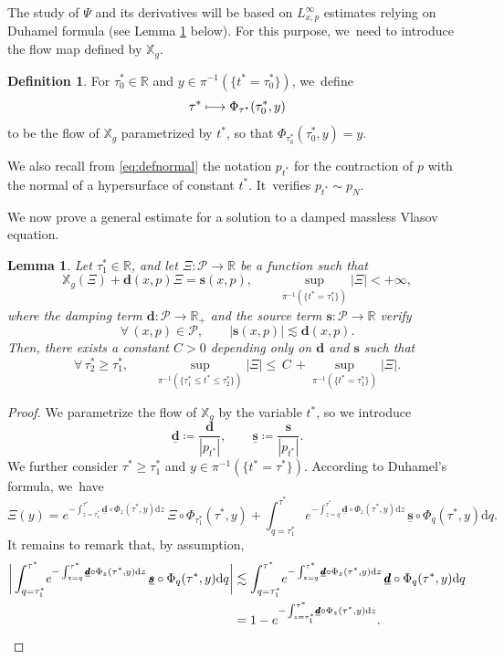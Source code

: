 \documentclass[JEP,XML,SOM,Unicode,published]{cedram}
\newcommand\mto{\mathchoice{\longmapsto}{\mapsto}{\mapsto}{\mapsto}}
\theoremstyle{plain}
\newtheorem{lemma}[proposition]{Lemma}
\theoremstyle{definition}
\newtheorem{definition}[proposition]{Definition}
\newcommand\R{{\mathbb{R}}}
\newcommand\T{{\mathbb{X}}}
\newcommand\dr{{\mathrm{d}}}
\begin{document}
The study of $\Psi$ and its derivatives will be based on $L^\infty_{x,p}$ estimates relying on Duhamel formula (see Lemma \ref{LemDuhamel} below). For this purpose, we~need to introduce the flow map defined by $\T_g$.
\begin{definition}
For $\tau^*_0\in \R$ and $y \in \pi^{-1}(\{t^*=\tau_0^* \})$, we~define
\[
\tau^* \mto \Phi_{\tau^*} (\tau_0^*,y)
\]
to be the flow of $\T_g$ parametrized by $t^*$, so that $\Phi_{\tau_0^*}(\tau_0^*,y)=y$.
\end{definition}
We also recall from \eqref{eq:defnormal} the notation $p_{t^*}$ for the contraction of $p$ with the normal of a hypersurface of constant $t^*$. It~verifies $p_{t^*} \sim p_N$.

We now prove a general estimate for a solution to a damped massless Vlasov equation.

\begin{lemma}\label{LemDuhamel}
Let $\tau_1^* \in \R$, and let $\Xi \colon \mathcal{P} \to \R$ be a function such that
\[
\T_g (\Xi)+ \pmb{d}(x,p) \Xi=\pmb{s}(x,p),\qquad \sup_{ \pi^{-1}(\{ t^* = \tau_1^* \}) }\big| \Xi \big| <+\infty,
\]
where the damping term $\pmb{d} \colon \mathcal{P} \to \R_+$ and the source term $\pmb{s} \colon \mathcal{P} \to \R$ verify
\[
\forall \, (x,p) \in \mathcal{P}, \qquad \big|\pmb{s} (x,p) \big| \lesssim \pmb{d}(x,p).
\]
Then, there exists a constant $C>0$ depending only on $\pmb{d}$ and $\pmb{s}$ such that
\[
\forall \, \tau_2^* \geq \tau_1^*,\qquad \sup_{\pi^{-1} (\{\tau_1^* \leq t^* \leq \tau_2^* \})} \big| \Xi \big| \leq \,C \,+\sup_{ \pi^{-1}(\{ t^* = \tau_1^* \}) }\big| \Xi \big|.
\]
\end{lemma}

\begin{proof}
We parametrize the flow of $\T_g$ by the variable $t^*$, so we introduce
\[
\underline{\pmb{d}} \coloneqq \frac{\pmb{d}}{|p_{t^*}|},\qquad \underline{\pmb{s}} \coloneqq \frac{\pmb{s}}{|p_{t^*}|}.
\]
We further consider $\tau^* \geq \tau_1^*$ and $y \in \pi^{-1}(\{t^*=\tau^* \})$. According to Duhamel's formula, we~have
\[
\Xi (y) = e^{-\int_{z=\tau_1^*}^{\tau^*} \underline{\pmb{d}} \circ \Phi_z(\tau^*,y) \dr z} \, \Xi \circ \Phi_{\tau_1^*}(\tau^*,y)+ \int_{q=\tau_1^*}^{\tau^*} e^{-\int_{z=q}^{\tau^*} \underline{\pmb{d}} \circ \Phi_z(\tau^*,y) \dr z} \, \underline{\pmb{s}} \circ \Phi_{q}(\tau^*,y) \dr q.
\]
It remains to remark that, by assumption,
\begin{align*}
\bigg|\int_{q=\tau_1^*}^{\tau^*} \! e^{-\int_{z=q}^{\tau^*} \underline{\pmb{d}} \circ \Phi_z(\tau^*,y) \dr z} \, \underline{\pmb{s}} \circ \Phi_{q}(\tau^*,y) \dr q \bigg| & \lesssim \int_{q=\tau_1^*}^{\tau^*} \! e^{-\int_{z=q}^{\tau^*} \underline{\pmb{d}} \circ \Phi_z(\tau^*,y) \dr z} \, \underline{\pmb{d}} \circ \Phi_{q}(\tau^*,y) \dr q \\
& =1- e^{-\int_{z=\tau_1^*}^{\tau^*} \! \underline{\pmb{d}} \circ \Phi_z(\tau^*,y) \dr z}. \qedhere
\end{align*}
\end{proof}
\end{document}
